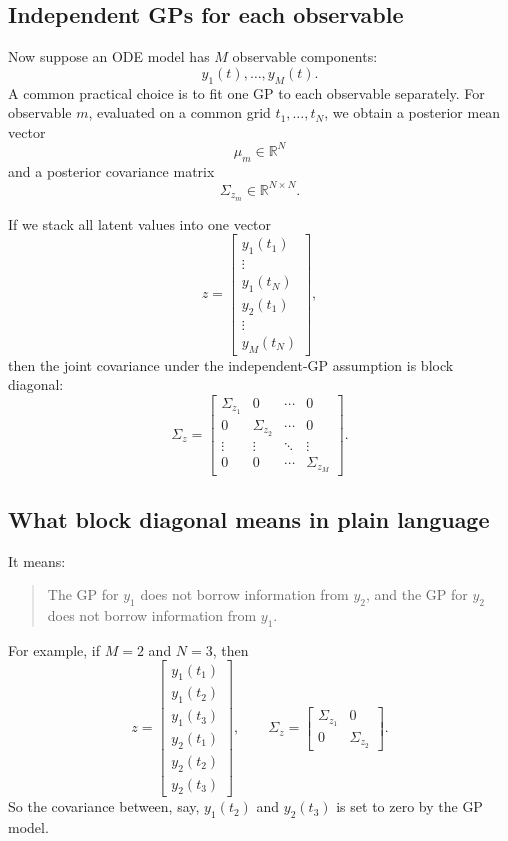 \documentclass[11pt]{article}
\begin{document}
\subsection*{Independent GPs for each observable}
Now suppose an ODE model has $M$ observable components:
\[
y_1(t),\dots,y_M(t).
\]
A common practical choice is to fit one GP to each observable separately. For observable $m$, evaluated on a common grid $t_1,\dots,t_N$, we obtain a posterior mean vector
\[
\mu_m \in \mathbb{R}^N
\]
and a posterior covariance matrix
\[
\Sigma_{z_m} \in \mathbb{R}^{N\times N}.
\]

If we stack all latent values into one vector
\[
z =
\begin{bmatrix}
y_1(t_1)\\
\vdots\\
y_1(t_N)\\
y_2(t_1)\\
\vdots\\
y_M(t_N)
\end{bmatrix},
\]
then the joint covariance under the independent-GP assumption is block diagonal:
\[
\Sigma_z =
\begin{bmatrix}
\Sigma_{z_1} & 0 & \cdots & 0\\
0 & \Sigma_{z_2} & \cdots & 0\\
\vdots & \vdots & \ddots & \vdots\\
0 & 0 & \cdots & \Sigma_{z_M}
\end{bmatrix}.
\]

\subsection*{What block diagonal means in plain language}
It means:
\begin{quote}
The GP for $y_1$ does not borrow information from $y_2$, and the GP for $y_2$ does not borrow information from $y_1$.
\end{quote}

For example, if $M=2$ and $N=3$, then
\[
z =
\begin{bmatrix}
y_1(t_1)\\
y_1(t_2)\\
y_1(t_3)\\
y_2(t_1)\\
y_2(t_2)\\
y_2(t_3)
\end{bmatrix},
\qquad
\Sigma_z =
\begin{bmatrix}
\Sigma_{z_1} & 0\\
0 & \Sigma_{z_2}
\end{bmatrix}.
\]
So the covariance between, say, $y_1(t_2)$ and $y_2(t_3)$ is set to zero by the GP model.
\end{document}
